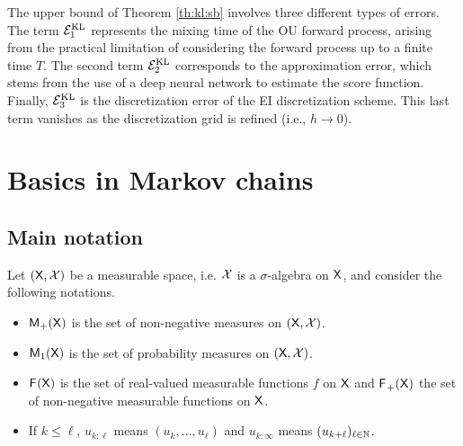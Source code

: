 \documentclass[english,graybox,envcountchap,envcountsame,sectrefs,shortlabels]{svmono}
\theoremstyle{style}
\renewenvironment{keywords}{\textit{\bf Keywords: } \sffamily }{}
\begin{document}
The upper bound of Theorem \ref{th:kl:sb} involves  three different types of errors. The term $\mathcal{E}_1^{\rm KL}$ represents the mixing time of the OU forward process, 
arising from the practical limitation of considering the forward process up to a finite time $T$. 
The second term $\mathcal{E}_2^{\rm KL}$   corresponds to the approximation error, which stems from the use of a deep neural network to estimate the score function.  Finally, $\mathcal{E}_3^{\rm KL}$ is the  discretization error of the EI discretization scheme. This last term vanishes as the discretization grid is refined (i.e., $h\to 0$).


\chapter{Basics in Markov chains}
\minitoc


\section{Main notation}

Let $(\mathsf{X},\mathcal{X})$ be a measurable space, i.e.  $\mathcal{X}$ is a $\sigma$-algebra on $\mathsf{X}$, and consider the following notations.
\begin{itemize}
\item $\mathsf{M}_{+}(\mathsf{X})$ is the set of non-negative measures on $(\mathsf{X},\mathcal{X})$.
\item $\mathsf{M}_{1}(\mathsf{X})$ is the set of probability measures on $(\mathsf{X},\mathcal{X})$.
\item $\mathsf{F_{}}(\mathsf{X})$ is the set of real-valued measurable functions
$f$ on $\mathsf{X}$ and $\mathsf{F_{}}_{+}(\mathsf{X})$ the set of non-negative measurable
functions on $\mathsf{X}$.
\item If $k\leq\ell$,  $u_{k:\ell}$ means $(u_{k},\ldots,u_{\ell})$ and $u_{k:\infty}$ means $(u_{k+\ell})_{\ell\in\mathbb{N}}$.
\end{itemize}
\end{document}
